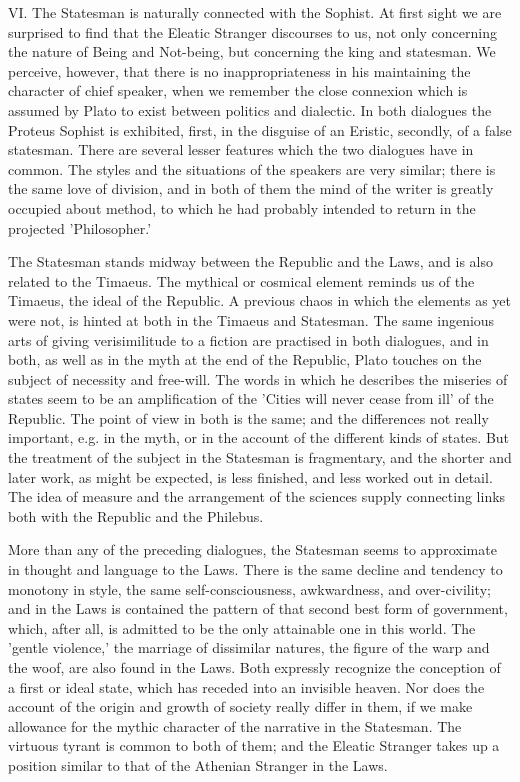 \documentclass[11pt,letter]{article}
\begin{document}
\par  VI. The Statesman is naturally connected with the Sophist. At first sight we are surprised to find that the Eleatic Stranger discourses to us, not only concerning the nature of Being and Not-being, but concerning the king and statesman. We perceive, however, that there is no inappropriateness in his maintaining the character of chief speaker, when we remember the close connexion which is assumed by Plato to exist between politics and dialectic. In both dialogues the Proteus Sophist is exhibited, first, in the disguise of an Eristic, secondly, of a false statesman. There are several lesser features which the two dialogues have in common. The styles and the situations of the speakers are very similar; there is the same love of division, and in both of them the mind of the writer is greatly occupied about method, to which he had probably intended to return in the projected 'Philosopher.'

\par  The Statesman stands midway between the Republic and the Laws, and is also related to the Timaeus. The mythical or cosmical element reminds us of the Timaeus, the ideal of the Republic. A previous chaos in which the elements as yet were not, is hinted at both in the Timaeus and Statesman. The same ingenious arts of giving verisimilitude to a fiction are practised in both dialogues, and in both, as well as in the myth at the end of the Republic, Plato touches on the subject of necessity and free-will. The words in which he describes the miseries of states seem to be an amplification of the 'Cities will never cease from ill' of the Republic. The point of view in both is the same; and the differences not really important, e.g. in the myth, or in the account of the different kinds of states. But the treatment of the subject in the Statesman is fragmentary, and the shorter and later work, as might be expected, is less finished, and less worked out in detail. The idea of measure and the arrangement of the sciences supply connecting links both with the Republic and the Philebus.

\par  More than any of the preceding dialogues, the Statesman seems to approximate in thought and language to the Laws. There is the same decline and tendency to monotony in style, the same self-consciousness, awkwardness, and over-civility; and in the Laws is contained the pattern of that second best form of government, which, after all, is admitted to be the only attainable one in this world. The 'gentle violence,' the marriage of dissimilar natures, the figure of the warp and the woof, are also found in the Laws. Both expressly recognize the conception of a first or ideal state, which has receded into an invisible heaven. Nor does the account of the origin and growth of society really differ in them, if we make allowance for the mythic character of the narrative in the Statesman. The virtuous tyrant is common to both of them; and the Eleatic Stranger takes up a position similar to that of the Athenian Stranger in the Laws.
\end{document}
